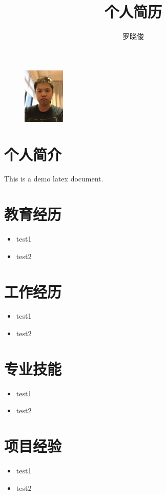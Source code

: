 \documentclass[a4paper,12pt]{article}
\title{个人简历}
\author{罗晓俊}
\begin{document}
	\begin{CJK}{UTF8}{gbsn}

		\maketitle{}

		\begin{figure}[h]
			\centering\includegraphics[height=100px]{webwxgetmsgimg.jpeg}
		\end{figure}

		\section{个人简介}
			This is a demo latex document.
		
		\section{教育经历}
			\begin{itemize}
				\item{test1}
				\item{test2}
			\end{itemize}
		
		\section{工作经历}
			\begin{itemize}
				\item{test1}
				\item{test2}
			\end{itemize}
		
		\section{专业技能}
			\begin{itemize}
				\item{test1}
				\item{test2}
			\end{itemize}
		
		\section{项目经验}
			\begin{itemize}
				\item{test1}
				\item{test2}
			\end{itemize}

	\end{CJK}
\end{document}
